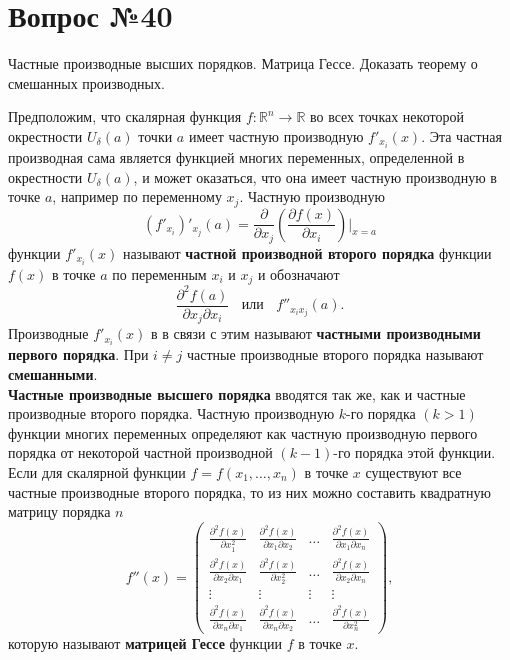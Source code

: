 \documentclass[12pt]{report}
\numberwithin{equation}{section}
\begin{document}
\newpage \section{Вопрос №40} %
\begin{framed}
Частные производные высших порядков. Матрица Гессе. Доказать теорему о смешанных производных.
\end{framed}
Предположим, что скалярная функция $f : \mathbb{R}^n \to \mathbb{R}$  во всех точках некоторой окрестности $U_{\delta}(a)$ точки $a$ имеет частную производную $f'_{x_i}(x)$. Эта частная производная сама является функцией многих переменных, определенной в окрестности $U_{\delta}(a)$, и может оказаться, что она имеет частную производную в точке $a$, например по переменному $x_j$. Частную производную
\[ (f'_{x_i})'_{x_j} (a) = \frac{\partial}{\partial x_j} \left( \frac{\partial f(x)}{\partial x_i} \right) \biggr\vert_{x = a}\]
функции $f'_{x_i}(x)$ называют \textbf{частной производной второго порядка} функции $f(x)$ в точке $a$ по переменным $x_i$ и $x_j$ и обозначают
\[ \frac{\partial^2 f(a)}{\partial x_j \partial x_i} ~~~~\text{или}~~~~f''_{x_i x_j}(a).\]
Производные $f'_{x_i}(x)$ в в связи с этим называют \textbf{частными производными первого порядка}. При $i \neq j$ частные производные второго порядка называют \textbf{смешанными}.\\

\textbf{Частные производные высшего порядка} вводятся так же, как и частные производные второго порядка. Частную производную $k$-го порядка $(k > 1)$ функции многих переменных определяют как частную производную первого порядка от некоторой частной производной $(k-1)$-го порядка этой функции.\\

Если для скалярной функции $f = f(x_1, \ldots, x_n)$ в точке $x$ существуют все частные производные второго порядка, то из них можно составить квадратную матрицу порядка $n$
\[ f''(x) = 
\begin{pmatrix}
\frac{\partial^2 f(x)}{\partial x_1^2} & \frac{\partial^2 f(x)}{\partial x_1 \partial x_2} & \dots & \frac{\partial^2 f(x)}{\partial x_1 \partial x_n}\\
\frac{\partial^2 f(x)}{\partial x_2 \partial x_1} & \frac{\partial^2 f(x)}{\partial x_2^2} & \dots & \frac{\partial^2 f(x)}{\partial x_2 \partial x_n}\\
\vdots & \vdots & \vdots  & \vdots\\
\frac{\partial^2 f(x)}{\partial x_n \partial x_1} & \frac{\partial^2 f(x)}{\partial x_n \partial x_2} & \dots & \frac{\partial^2 f(x)}{\partial x_n^2}
\end{pmatrix},\]
которую называют \textbf{матрицей Гессе} функции $f$ в точке $x$.
\end{document}
